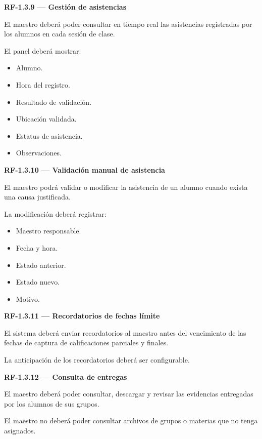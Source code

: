 \documentclass[12pt,a4paper]{article}
\newcommand{\RF}[1]{\textbf{\color{primary}RF-#1}}
\newenvironment{requisito}[1]
{
\begin{center}
\begin{minipage}{0.96\textwidth}
\colorbox{requirement}{
\begin{minipage}{0.94\textwidth}
\textbf{#1}
\end{minipage}
}
\vspace{2mm}
}
{
\end{minipage}
\end{center}
}
\begin{document}
\begin{requisito}{\RF{1.3.9} --- Gestión de asistencias}
El maestro deberá poder consultar en tiempo real las asistencias registradas por
los alumnos en cada sesión de clase.

El panel deberá mostrar:

\begin{itemize}[leftmargin=*]
\item Alumno.
\item Hora del registro.
\item Resultado de validación.
\item Ubicación validada.
\item Estatus de asistencia.
\item Observaciones.
\end{itemize}
\end{requisito}

\begin{requisito}{\RF{1.3.10} --- Validación manual de asistencia}
El maestro podrá validar o modificar la asistencia de un alumno cuando exista
una causa justificada.

La modificación deberá registrar:

\begin{itemize}[leftmargin=*]
\item Maestro responsable.
\item Fecha y hora.
\item Estado anterior.
\item Estado nuevo.
\item Motivo.
\end{itemize}
\end{requisito}

\begin{requisito}{\RF{1.3.11} --- Recordatorios de fechas límite}
El sistema deberá enviar recordatorios al maestro antes del vencimiento de las
fechas de captura de calificaciones parciales y finales.

La anticipación de los recordatorios deberá ser configurable.
\end{requisito}

\begin{requisito}{\RF{1.3.12} --- Consulta de entregas}
El maestro deberá poder consultar, descargar y revisar las evidencias entregadas
por los alumnos de sus grupos.

El maestro no deberá poder consultar archivos de grupos o materias que no tenga
asignados.
\end{requisito}
\end{document}

